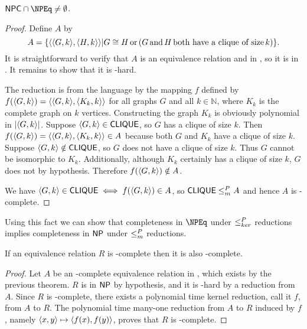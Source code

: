 \begin{theorem}\label{thm:npcnpeq}
  $\NPC\cap\NPEq\neq\emptyset$.
\end{theorem}
\begin{proof}
  Define $A$ by
  \begin{displaymath}
    A=\{\langle\langle G,k\rangle,\langle H,k\rangle\rangle|G\cong H \,\text{or}\, (G \,\text{and}\, H \,\text{both have a clique of size}\, k)\}.
  \end{displaymath}
  It is straightforward to verify that $A$ is an equivalence relation and in \NP, so it is in \NPEq.
  It remains to show that it is \NP-hard.

  The reduction is from the language  by the mapping $f$ defined by $f(\langle G,k\rangle)=\langle\langle G,k\rangle,\langle K_k,k\rangle\rangle$ for all graphs $G$ and all $k\in\mathbb{N}$, where $K_k$ is the complete graph on $k$ vertices.
  Constructing the graph $K_k$ is obviously polynomial in $|\langle G,k\rangle|$.
  Suppose $\langle G,k\rangle\in {\ensuremath{\mathsf{CLIQUE}}}$, so $G$ has a clique of size $k$.
  Then $f(\langle G,k\rangle)=\langle\langle G,k\rangle,\langle K_k,k\rangle\rangle\in A$ because both $G$ and $K_k$ have a clique of size $k$.
  Suppose $\langle G,k\rangle\notin {\ensuremath{\mathsf{CLIQUE}}}$, so $G$ does not have a clique of size $k$.
  Thus $G$ cannot be isomorphic to $K_k$.
  Additionally, although $K_k$ certainly has a clique of size $k$, $G$ does not by hypothesis.
  Therefore $f(\langle G,k\rangle)\notin A$.

  We have $\langle G,k\rangle\in {\ensuremath{\mathsf{CLIQUE}}} \iff f(\langle G,k\rangle)\in A$, so ${\mathsf{CLIQUE}}\leq^{P}_{m} A$ and hence $A$ is \NP-complete.
\end{proof}

Using this fact we can show that completeness in $\NPEq$ under $\leq^{P}_{ker}$ reductions implies completeness in ${\mathsf{NP}}$ under $\leq^{P}_{m}$ reductions.

\begin{corollary}
  If an equivalence relation $R$ is \NPEq-complete then it is also \NP-complete.
\end{corollary}
\begin{proof}
  Let $A$ be an \NP-complete equivalence relation in \NPEq, which exists by the previous theorem.
  $R$ is in ${\mathsf{NP}}$ by hypothesis, and it is \NP-hard by a reduction from $A$.
  Since $R$ is \NPEq-complete, there exists a polynomial time kernel reduction, call it $f$, from $A$ to $R$.
  The polynomial time many-one reduction from $A$ to $R$ induced by $f$, namely $\langle x,y\rangle\mapsto\langle f(x),f(y)\rangle$, proves that $R$ is \NP-complete.
\end{proof}

